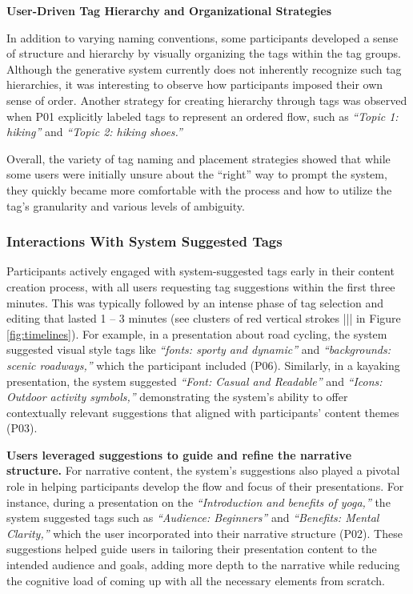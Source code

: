 \textbf{User-Driven Tag Hierarchy and Organizational Strategies}


In addition to varying naming conventions, some participants developed a sense of structure and hierarchy by visually organizing the tags within the tag groups. Although the generative system currently does not inherently recognize such tag hierarchies, it was interesting to observe how participants imposed their own sense of order. 
Another strategy for creating hierarchy through tags was observed when P01 explicitly labeled tags to represent an ordered flow, such as \textit{“Topic 1: hiking”} and \textit{“Topic 2: hiking shoes.”} 


Overall, the variety of tag naming and placement strategies showed that while some users were initially unsure about the “right” way to prompt the system, they quickly became more comfortable with the process and how to utilize the tag's granularity and various levels of ambiguity.


\subsubsection{\textbf{Interactions With System Suggested Tags}} \label{Interactions_With_System_Suggested_Tags}

Participants actively engaged with system-suggested tags early in their content creation process, with all users requesting tag suggestions within the first three minutes. This was typically followed by an intense phase of tag selection and editing that lasted 1 – 3 minutes (see clusters of red vertical strokes ||| in Figure \ref{fig:timelines}). 
For example, in a presentation about road cycling, the system suggested visual style tags like \textit{“fonts: sporty and dynamic”} and \textit{“backgrounds: scenic roadways,”} which the participant included (P06). Similarly, in a kayaking presentation, the system suggested \textit{“Font: Casual and Readable”} and \textit{“Icons: Outdoor activity symbols,”} demonstrating the system’s ability to offer contextually relevant suggestions that aligned with participants’ content themes (P03).

\textbf{Users leveraged suggestions to guide and refine the narrative structure.}
For narrative content, the system’s suggestions also played a pivotal role in helping participants develop the flow and focus of their presentations. For instance, during a presentation on the \textit{“Introduction and benefits of yoga,”} the system suggested tags such as \textit{“Audience: Beginners”} and \textit{“Benefits: Mental Clarity,”} which the user incorporated into their narrative structure (P02). These suggestions helped guide users in tailoring their presentation content to the intended audience and goals, adding more depth to the narrative while reducing the cognitive load of coming up with all the necessary elements from scratch.

